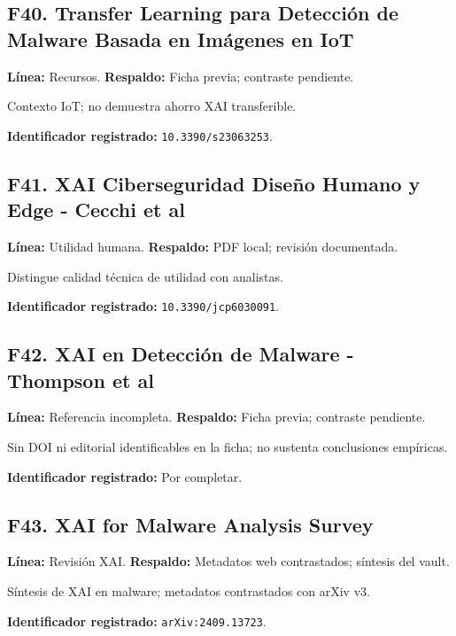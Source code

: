 \begin{samepage}
\subsection*{F40. Transfer Learning para Detección de Malware Basada en Imágenes en IoT}
\noindent\textbf{Línea:} Recursos. \textbf{Respaldo:} Ficha previa; contraste pendiente. 

Contexto IoT; no demuestra ahorro XAI transferible.

\noindent\textbf{Identificador registrado:} \nolinkurl{10.3390/s23063253}.

\end{samepage}
\begin{samepage}
\subsection*{F41. XAI Ciberseguridad Diseño Humano y Edge - Cecchi et al}
\noindent\textbf{Línea:} Utilidad humana. \textbf{Respaldo:} PDF local; revisión documentada. \parencite{Cecchi2026Connecting}

Distingue calidad técnica de utilidad con analistas.

\noindent\textbf{Identificador registrado:} \nolinkurl{10.3390/jcp6030091}.

\end{samepage}
\begin{samepage}
\subsection*{F42. XAI en Detección de Malware - Thompson et al}
\noindent\textbf{Línea:} Referencia incompleta. \textbf{Respaldo:} Ficha previa; contraste pendiente. 

Sin DOI ni editorial identificables en la ficha; no sustenta conclusiones empíricas.

\noindent\textbf{Identificador registrado:} Por completar.

\end{samepage}
\begin{samepage}
\subsection*{F43. XAI for Malware Analysis Survey}
\noindent\textbf{Línea:} Revisión XAI. \textbf{Respaldo:} Metadatos web contrastados; síntesis del vault. 

Síntesis de XAI en malware; metadatos contrastados con arXiv v3.

\noindent\textbf{Identificador registrado:} \nolinkurl{arXiv:2409.13723}.

\end{samepage}
\normalsize
